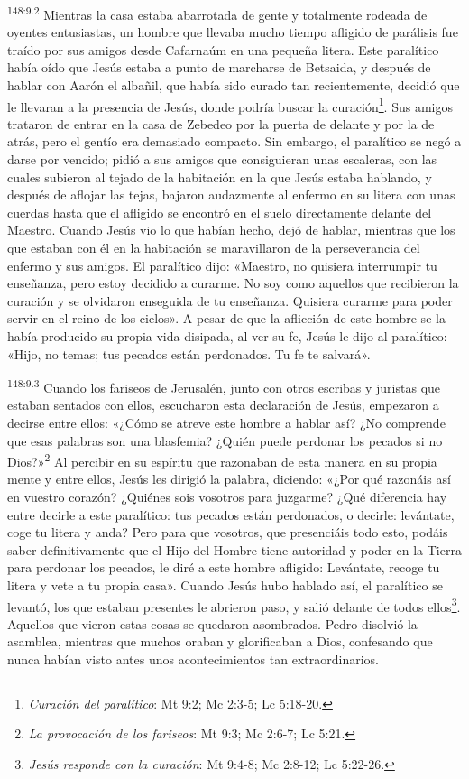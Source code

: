 \par 
\textsuperscript{148:9.2} Mientras la casa estaba abarrotada de gente y totalmente rodeada de oyentes entusiastas, un hombre que llevaba mucho tiempo afligido de parálisis fue traído por sus amigos desde Cafarnaúm en una pequeña litera. Este paralítico había oído que Jesús estaba a punto de marcharse de Betsaida, y después de hablar con Aarón el albañil, que había sido curado tan recientemente, decidió que le llevaran a la presencia de Jesús, donde podría buscar la curación\footnote{\textit{Curación del paralítico}: Mt 9:2; Mc 2:3-5; Lc 5:18-20.}. Sus amigos trataron de entrar en la casa de Zebedeo por la puerta de delante y por la de atrás, pero el gentío era demasiado compacto. Sin embargo, el paralítico se negó a darse por vencido; pidió a sus amigos que consiguieran unas escaleras, con las cuales subieron al tejado de la habitación en la que Jesús estaba hablando, y después de aflojar las tejas, bajaron audazmente al enfermo en su litera con unas cuerdas hasta que el afligido se encontró en el suelo directamente delante del Maestro. Cuando Jesús vio lo que habían hecho, dejó de hablar, mientras que los que estaban con él en la habitación se maravillaron de la perseverancia del enfermo y sus amigos. El paralítico dijo: «Maestro, no quisiera interrumpir tu enseñanza, pero estoy decidido a curarme. No soy como aquellos que recibieron la curación y se olvidaron enseguida de tu enseñanza. Quisiera curarme para poder servir en el reino de los cielos». A pesar de que la aflicción de este hombre se la había producido su propia vida disipada, al ver su fe, Jesús le dijo al paralítico: «Hijo, no temas; tus pecados están perdonados. Tu fe te salvará».

\par 
\textsuperscript{148:9.3} Cuando los fariseos de Jerusalén, junto con otros escribas y juristas que estaban sentados con ellos, escucharon esta declaración de Jesús, empezaron a decirse entre ellos: «¿Cómo se atreve este hombre a hablar así? ¿No comprende que esas palabras son una blasfemia? ¿Quién puede perdonar los pecados si no Dios?»\footnote{\textit{La provocación de los fariseos}: Mt 9:3; Mc 2:6-7; Lc 5:21.} Al percibir en su espíritu que razonaban de esta manera en su propia mente y entre ellos, Jesús les dirigió la palabra, diciendo: «¿Por qué razonáis así en vuestro corazón? ¿Quiénes sois vosotros para juzgarme? ¿Qué diferencia hay entre decirle a este paralítico: tus pecados están perdonados, o decirle: levántate, coge tu litera y anda? Pero para que vosotros, que presenciáis todo esto, podáis saber definitivamente que el Hijo del Hombre tiene autoridad y poder en la Tierra para perdonar los pecados, le diré a este hombre afligido: Levántate, recoge tu litera y vete a tu propia casa». Cuando Jesús hubo hablado así, el paralítico se levantó, los que estaban presentes le abrieron paso, y salió delante de todos ellos\footnote{\textit{Jesús responde con la curación}: Mt 9:4-8; Mc 2:8-12; Lc 5:22-26.}. Aquellos que vieron estas cosas se quedaron asombrados. Pedro disolvió la asamblea, mientras que muchos oraban y glorificaban a Dios, confesando que nunca habían visto antes unos acontecimientos tan extraordinarios.

